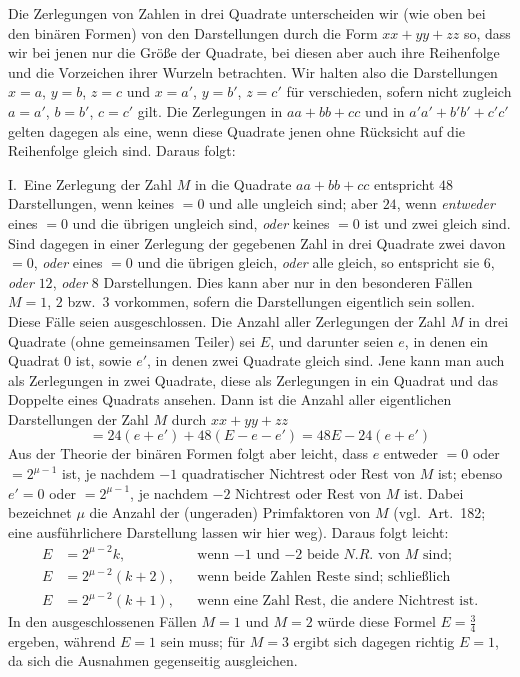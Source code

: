 Die Zerlegungen von Zahlen in drei Quadrate unterscheiden wir (wie
oben bei den binären Formen) von den Darstellungen durch die Form
$xx+yy+zz$ so, dass wir bei jenen nur die Größe der Quadrate, bei diesen
aber auch ihre Reihenfolge und die Vorzeichen ihrer Wurzeln betrachten.
Wir halten also die Darstellungen $x=a$, $y=b$, $z=c$ und $x=a'$,
$y=b'$, $z=c'$ für verschieden, sofern nicht zugleich $a=a'$, $b=b'$,
$c=c'$ gilt. Die Zerlegungen in $aa+bb+cc$ und in $a'a'+b'b'+c'c'$ gelten dagegen
als eine, wenn diese Quadrate jenen ohne Rücksicht auf die Reihenfolge
gleich sind. Daraus folgt:

I.\ Eine Zerlegung der Zahl $M$ in die Quadrate $aa+bb+cc$ entspricht
$48$ Darstellungen, wenn keines $=0$ und alle ungleich sind;
aber $24$, wenn \textit{entweder} eines $=0$ und die übrigen
ungleich sind, \textit{oder} keines $=0$ ist und zwei gleich sind.
Sind dagegen in einer Zerlegung der gegebenen Zahl in drei Quadrate
zwei davon $=0$, \textit{oder} eines $=0$ und die übrigen
gleich, \textit{oder} alle gleich, so entspricht sie $6$,
\textit{oder} $12$, \textit{oder} $8$ Darstellungen. Dies kann
aber nur in den besonderen Fällen $M=1$, $2$ bzw.\ $3$
vorkommen, sofern die Darstellungen eigentlich sein sollen. Diese
Fälle seien ausgeschlossen. Die Anzahl aller Zerlegungen der Zahl
$M$ in drei Quadrate (ohne gemeinsamen Teiler) sei $E$, und
darunter seien $e$, in denen ein Quadrat $0$ ist, sowie
$e'$, in denen zwei Quadrate gleich sind. Jene kann man auch als
Zerlegungen in zwei Quadrate, diese als Zerlegungen in ein Quadrat
und das Doppelte eines Quadrats ansehen. Dann ist die Anzahl aller
eigentlichen Darstellungen der Zahl $M$ durch $xx+yy+zz$
\[
=24(e+e')+48(E-e-e')=48E-24(e+e')
\]
Aus der Theorie der binären Formen folgt aber leicht, dass $e$
entweder $=0$ oder $=2^{\mu-1}$ ist, je nachdem $-1$ quadratischer
Nichtrest oder Rest von $M$ ist; ebenso $e'=0$ oder $=2^{\mu-1}$,
je nachdem $-2$ Nichtrest oder Rest von $M$ ist. Dabei bezeichnet
$\mu$ die Anzahl der (ungeraden) Primfaktoren von $M$ (vgl.\
Art.\ 182; eine ausführlichere Darstellung lassen wir hier weg).
Daraus folgt leicht:
\[
\begin{aligned}
E&=2^{\mu-2}k,&&\text{wenn $-1$ und $-2$ beide $N.R.$ von $M$ sind;}\\
E&=2^{\mu-2}(k+2),&&\text{wenn beide Zahlen Reste sind; schließlich}\\
E&=2^{\mu-2}(k+1),&&\text{wenn eine Zahl Rest, die andere Nichtrest ist.}
\end{aligned}
\]
In den ausgeschlossenen Fällen $M=1$ und $M=2$ würde diese
Formel $E=\tfrac{3}{4}$ ergeben, während $E=1$ sein muss; für $M=3$ ergibt
sich dagegen richtig $E=1$, da sich die Ausnahmen gegenseitig ausgleichen.

